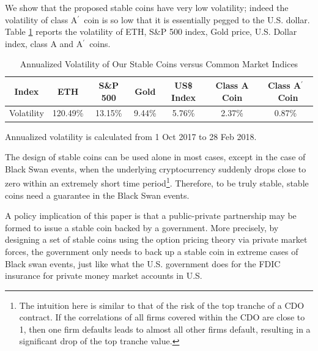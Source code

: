 \documentclass[draft, noinfoline]{ectaart}
\numberwithin{equation}{section}
\theoremstyle{plain}
\newcommand{\Ap}{A\ensuremath{^\prime}~}
\begin{document}
We show that the proposed stable coins have very low volatility; indeed the volatility of class \Ap coin is so low that it is essentially pegged to the U.S. dollar.
Table \ref{tbl:volcomp} reports the volatility of ETH, S\&P 500 index, Gold price, U.S. Dollar index, class A and \Ap coins.

\begin{table}[!htb]
	\footnotesize
	\centering
	\caption{Annualized Volatility of Our Stable Coins versus Common Market Indices}\label{tbl:volcomp}
	\begin{tabular}{@{}c c c c c c c}
	\toprule
	Index & ETH & S\&P 500 & Gold &  US\$ Index & Class A Coin & Class \Ap Coin \\\midrule
	Volatility & 120.49\% & 13.15\% & 9.44\%  & 5.76\% & 2.37\% & 0.87\%\\
	\bottomrule
	\end{tabular}
	\vspace{0.5em}
	\par\flushleft\footnotesize Annualized volatility is calculated from 1 Oct 2017 to 28 Feb 2018.
\end{table}


The design of stable coins can be used alone in most cases, except in the case of Black Swan events, when the underlying cryptocurrency suddenly drops close to zero within an extremely short time period\footnote{The intuition here is similar to that of the risk of the top tranche of a CDO contract. If the correlations of all firms covered within the CDO are close to 1, then one firm defaults leads to almost all other firms default, resulting in a significant drop of the top tranche value.}. Therefore, to be truly stable, stable coins need a guarantee in the Black Swan events.




A policy implication of this paper is that a public-private partnership may be formed to issue a stable coin backed by a government. More precisely, by designing a set of stable coins using the option pricing theory via private market forces, the government only needs to back up a stable coin in extreme cases of Black swan events, just like what the U.S. government does for the FDIC insurance for private money market accounts in U.S.


\end{document}
